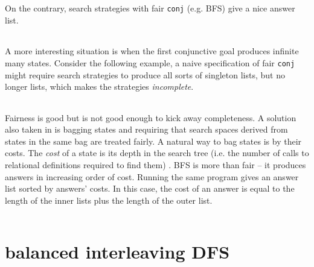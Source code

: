 \documentclass[format=acmlarge, review=true, authordraft=true]{acmart}
\newcommand{\conj}{\texttt{conj}}
\begin{document}
\begin{center}
	\begin{tabular}{c}
		
	\end{tabular}
\end{center}

On the contrary, search strategies with fair \conj{} (e.g. BFS) give a nice answer list.

\begin{center}
	\begin{tabular}{c}
		
	\end{tabular}
\end{center}

A more interesting situation is when the first conjunctive goal produces infinite many states. Consider the following example, a naive specification of fair \conj{} might require search strategies to produce all sorts of singleton lists, but no longer lists, which makes the strategies \emph{incomplete}. 

\begin{center}
	\begin{tabular}{c}
		
	\end{tabular}
\end{center}

Fairness is good but is not good enough to kick away completeness. A solution also taken in \citep{seres1999algebra} is bagging states and requiring that search spaces derived from states in the same bag are treated fairly. A natural way to bag states is by their costs. The \emph{cost} of a state is its depth in the search tree (i.e. the number of calls to relational definitions required to find them) \citep{seres1999algebra}. BFS is more than fair -- it produces answers in increasing order of cost. Running the same program gives an answer list sorted by answers' costs. In this case, the cost of an answer is equal to the length of the inner lists plus the length of the outer list.

\begin{center}
	\begin{tabular}{c}
		
	\end{tabular}
\end{center}
 
\section{balanced interleaving DFS}
\end{document}
